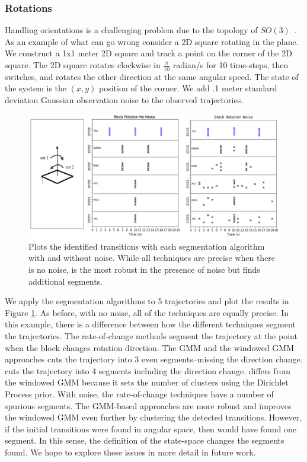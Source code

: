 \subsubsection{Rotations}
Handling orientations is a challenging problem due to the topology of $SO(3)$~\cite{ude2014orientation}. 
As an example of what can go wrong consider a 2D square rotating in the plane.
We construct a 1x1 meter 2D square and track a point on the corner of the 2D square.
The 2D square rotates clockwise in $\frac{\pi}{10}$ radian/s for 
10 time-steps, then switches, and rotates the other direction at the same angular speed.
The state of the system is the $(x,y)$ position of the corner.
We add .1 meter standard deviation Gaussian observation noise to the observed trajectories.

\begin{figure}[ht!]%
\centering
\includegraphics[width=\columnwidth]{tsc-experiments/block-results2.png}
\caption{Plots the identified transitions with each segmentation algorithm with and without noise. While all techniques are precise when there is no noise, \tsc is the most robust in the presence of noise but finds additional segments. \label{block-results}}
\end{figure}


We apply the segmentation algorithms to 5 trajectories and plot the results in Figure \ref{block-results}.
As before, with no noise, all of the techniques are equally precise.
In this example, there is a difference between how the different techniques segment the trajectories.
The rate-of-change methods segment the trajectory at the point when the block changes rotation direction.
The GMM and the windowed GMM approaches cuts the trajectory into 3 even segments--missing the direction change.
\tsc cuts the trajectory into 4 segments including the direction change.
\tsc differs from the windowed GMM because it sets the number of clusters using the Dirichlet Process prior.
With noise, the rate-of-change techniques have a number of spurious segments.
The GMM-based approaches are more robust and \tsc improves the windowed GMM even further by clustering the detected transitions.
However, if the initial transitions were found in angular space, then \tsc would have found one segment.
In this sense, the definition of the state-space changes the segments found.
We hope to explore these issues in more detail in future work.


